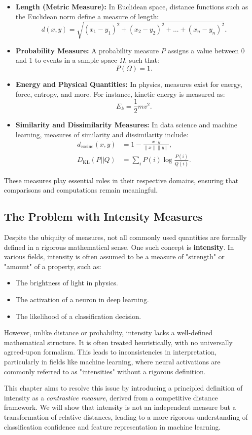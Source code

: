 \begin{itemize}
    \item \textbf{Length (Metric Measure):} In Euclidean space, distance functions such as the Euclidean norm define a measure of length:
    \[
    d(x, y) = \sqrt{(x_1 - y_1)^2 + (x_2 - y_2)^2 + \dots + (x_n - y_n)^2}.
    \]
    \item \textbf{Probability Measure:} A probability measure \( P \) assigns a value between 0 and 1 to events in a sample space \( \Omega \), such that:
    \[
    P(\Omega) = 1.
    \]
    \item \textbf{Energy and Physical Quantities:} In physics, measures exist for energy, force, entropy, and more. For instance, kinetic energy is measured as:
    \[
    E_k = \frac{1}{2} m v^2.
    \]
    \item \textbf{Similarity and Dissimilarity Measures:} In data science and machine learning, measures of similarity and dissimilarity include:
    \begin{align}
        d_{\text{cosine}}(x, y) &= 1 - \frac{x \cdot y}{\|x\| \|y\|}, \\
        D_{\text{KL}}(P || Q) &= \sum_i P(i) \log \frac{P(i)}{Q(i)}.
    \end{align}
\end{itemize}

These measures play essential roles in their respective domains, ensuring that comparisons and computations remain meaningful.

\subsection{The Problem with Intensity Measures}

Despite the ubiquity of measures, not all commonly used quantities are formally defined in a rigorous mathematical sense. One such concept is \textbf{intensity}. In various fields, intensity is often assumed to be a measure of "strength" or "amount" of a property, such as:

\begin{itemize}
    \item The brightness of light in physics.
    \item The activation of a neuron in deep learning.
    \item The likelihood of a classification decision.
\end{itemize}

However, unlike distance or probability, intensity lacks a well-defined mathematical structure. It is often treated heuristically, with no universally agreed-upon formalism. This leads to inconsistencies in interpretation, particularly in fields like machine learning, where neural activations are commonly referred to as "intensities" without a rigorous definition.

This chapter aims to resolve this issue by introducing a principled definition of intensity as a \textit{contrastive measure}, derived from a competitive distance framework. We will show that intensity is not an independent measure but a transformation of relative distances, leading to a more rigorous understanding of classification confidence and feature representation in machine learning.

